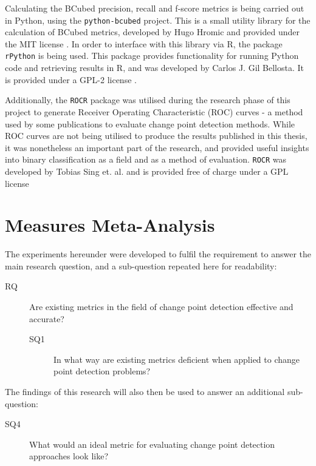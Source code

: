 \documentclass[../main.tex]{subfiles}
\begin{document}
Calculating the BCubed precision, recall and f-score metrics is being carried out in Python, using the \texttt{python-bcubed} project. This is a small utility library for the calculation of BCubed metrics, developed by Hugo Hromic and provided under the MIT license \cite{Hromic2016}. In order to interface with this library via \textsf{R}, the package \texttt{rPython} is being used. This package provides functionality for running Python code and retrieving results in \textsf{R}, and was developed by Carlos J. Gil Bellosta. It is provided under a GPL-2 license \cite{Bellosta2015}.

Additionally, the \texttt{ROCR} package was utilised during the research phase of this project to generate Receiver Operating Characteristic (ROC) curves - a method used by some publications to evaluate change point detection methods. While ROC curves are not being utilised to produce the results published in this thesis, it was nonetheless an important part of the research, and provided useful insights into binary classification as a field and as a method of evaluation. \texttt{ROCR} was developed by Tobias Sing et. al. and is provided free of charge under a GPL license \cite{Sing2005}

\section{Measures Meta-Analysis}
\label{meta analysis explainer}

The experiments hereunder were developed to fulfil the requirement to answer the main research question, and a sub-question repeated here for readability:

\begin{description}
    \item[RQ] Are existing metrics in the field of change point detection effective and accurate?
    \begin{description}
    \item[SQ1] In what way are existing metrics deficient when applied to change point detection problems?
\end{description}
\end{description}

The findings of this research will also then be used to answer an additional sub-question:

\begin{description}
    \item[SQ4] What would an ideal metric for evaluating change point detection approaches look like?
\end{description}
\end{document}
